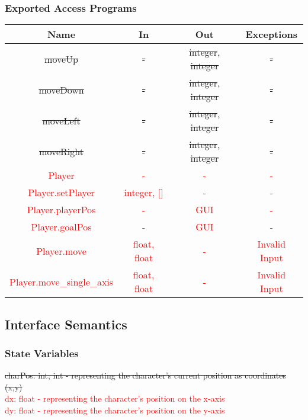 \documentclass[12pt, titlepage]{article}
\begin{document}
		\subsubsection{Exported Access Programs}
		\begin{tabular}[pos]{|c|c|c|c|}
			\hline
			\textbf{Name}& \textbf{In} & \textbf{Out} & \textbf{Exceptions} \\ \hline
			\sout{moveUp} & \sout{-} & \sout{integer}, \sout{integer} & \sout{-} \\ \hline
			\sout{moveDown} & \sout{-} & \sout{integer}, \sout{integer} & \sout{-} \\ \hline
			\sout{moveLeft} & \sout{-} & \sout{integer}, \sout{integer} & \sout{-} \\ \hline
			\sout{moveRight} & \sout{-} & \sout{integer}, \sout{integer} & \sout{-} \\ \hline
			\textcolor{red}{Player} & \textcolor{red}{-} & \textcolor{red}{-} & \textcolor{red}{-} \\ \hline
			\textcolor{red}{Player.setPlayer} & \textcolor{red}{integer, []} & \textcolor{red}{-} & \textcolor{red}{-} \\ \hline
			\textcolor{red}{Player.playerPos} & \textcolor{red}{-} & \textcolor{red}{GUI} & \textcolor{red}{-} \\ \hline
			\textcolor{red}{Player.goalPos} & \textcolor{red}{-} & \textcolor{red}{GUI} & \textcolor{red}{-} \\ \hline
			\textcolor{red}{Player.move} & \textcolor{red}{float, float} & \textcolor{red}{-} & \textcolor{red}{Invalid Input} \\ \hline
			\textcolor{red}{Player.move\_single\_axis} & \textcolor{red}{float, float} & \textcolor{red}{-} & \textcolor{red}{Invalid Input} \\ \hline
			
		\end{tabular}
		
		\subsection{Interface Semantics}
		\subsubsection{State Variables}
		\sout{charPos: int, int - representing the character's current position as coordinates (x,y)}\\
		\textcolor{red}{dx: float - representing the character's position on the x-axis}\\
		\textcolor{red}{dy: float - representing the character's position on the y-axis}\\
\end{document}

